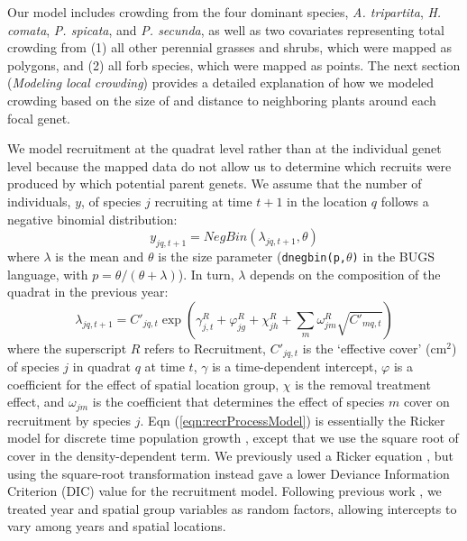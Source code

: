 \documentclass[11pt]{article}
\begin{document}
Our model includes crowding from the four dominant species, \textit{A. tripartita}, \textit{H. comata}, \textit{P. spicata}, and \textit{P. secunda}, as well as two covariates representing total crowding from (1) all other perennial grasses and shrubs, which were mapped as polygons, and (2) all forb species, which were mapped as points. The next section (\textit{Modeling local crowding}) provides a detailed explanation of how we modeled crowding based on the size of and distance to neighboring plants around each focal genet.

We model recruitment at the quadrat level rather than at the individual genet level because the mapped data do not allow 
us to determine which recruits were produced by which potential parent genets. We assume that the number of individuals, $y$, of species $j$ recruiting at 
time $t+1$ in the location $q$ follows a negative binomial distribution:
\begin{equation}
y_{jq,t+1}= NegBin(\lambda_{jq,t+1},\theta) 	   
\label{eqn:recrDataModel}
\end{equation}
where $\lambda$ is the mean and $\theta$ is the size parameter (\texttt{dnegbin(p,$\theta$)} in the BUGS language, with $p=\theta/(\theta+\lambda)$). 
In turn, $\lambda$ depends on the composition of the quadrat in the previous year:
\begin{equation}
\lambda_{jq,t+1} = C'_{jq,t} \exp{\left(\gamma_{j,t}^R +  \varphi_{jg}^R + \chi_{jh}^R + 
\sum \limits_{m} \omega_{jm}^R \sqrt{C'_{mq,t}} \right)}
\label{eqn:recrProcessModel}
\end{equation}
where the superscript $R$ refers to Recruitment, $C'_{jq,t}$ is the `effective cover' (cm$^2$) of species $j$ in quadrat $q$ at time $t$, $\gamma$ 
is a time-dependent intercept, $\varphi$ is a coefficient for the effect of spatial location group,
$\chi$ is the removal treatment effect, and $\omega_{jm}$ is the coefficient that determines the effect of species $m$ cover on recruitment by species $j$. 
Eqn (\ref{eqn:recrProcessModel}) is essentially the Ricker model for discrete time population growth \citep{ricker_stock_1954}, except that we use the square root of cover in the density-dependent term. We previously used a Ricker equation \citep{adler_coexistence_2010}, but using the square-root transformation instead gave a lower Deviance Information Criterion (DIC) value \citep{spiegelhalter_bayesian_2002} for the recruitment model. Following previous work \citep{adler_coexistence_2010}, we treated year and spatial group variables as random factors, allowing intercepts to vary among years and spatial locations. 
\end{document}
